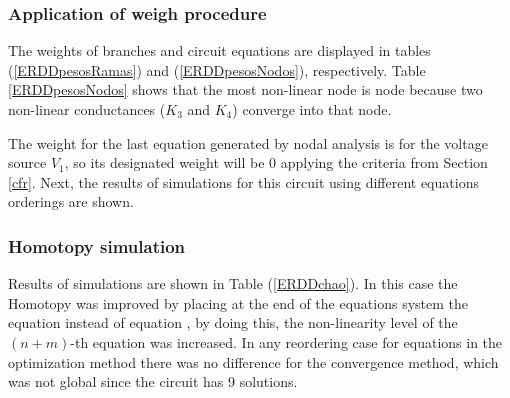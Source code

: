 \documentclass[conference,letterpaper,onecolumn,11pt]{IEEEtran}
\begin{document}
\subsubsection{Application of weigh procedure}

The weights of branches and circuit equations are displayed in tables (\ref{ERDDpesosRamas}) and (\ref{ERDDpesosNodos}), respectively. Table \ref{ERDDpesosNodos} shows that the most non-linear node is node  because two non-linear conductances ($K_3$ and $K_4$) converge into that node.

\begin{table}[!h]
\caption{Weights of branch functions for the ERDD circuit.}
\label{ERDDpesosRamas}
\end{table}

\begin{table}[!h]
\caption{Weights of nodes for the ERDD circuit.}
\label{ERDDpesosNodos}
\end{table}

The weight for the last equation generated by nodal analysis is for the voltage source $V_1$, so its designated weight will be 0 applying the criteria from Section \ref{cfr}. Next, the results of simulations for this circuit using different equations orderings are shown.

\subsubsection{Homotopy simulation}

Results of simulations are shown in Table (\ref{ERDDchao}). In this case the Homotopy was improved by placing at the end of the equations system the equation  instead of equation , by doing this, the non-linearity level of the $(n+m)$-th equation was increased. In any reordering case for equations in the optimization method there was no difference for the convergence method, which was not global since the circuit has 9 solutions.
\end{document}
